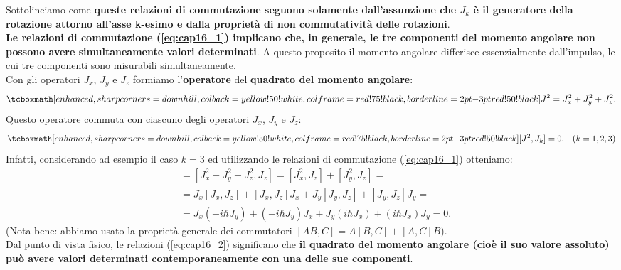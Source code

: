 Sottolineiamo come \textbf{queste relazioni di commutazione seguono solamente dall'assunzione che $J_k$ è il generatore della rotazione attorno all'asse k-esimo e dalla proprietà di non commutatività delle rotazioni}.\\

\textbf{Le relazioni di commutazione (\ref{eq:cap16_1}) implicano che, in generale, le tre componenti del momento angolare non possono avere simultaneamente valori determinati}. A questo proposito il momento angolare differisce essenzialmente dall'impulso, le cui tre componenti sono misurabili simultaneamente.\\
		
Con gli operatori $J_x$, $J_y$ e $J_z$ formiamo l'\textbf{operatore} del \textbf{quadrato del momento angolare}:
	\begin{equation}
		\tcboxmath[enhanced, sharp corners=downhill, colback=yellow!50!white, colframe=red!75!black, borderline={2pt}{-3pt}{red!50!black}]{
			J^2 = J_x ^2 + J_y ^2 + J_z ^2.
			}
	\end{equation}
Questo operatore commuta con ciascuno degli operatori $J_x$, $J_y$ e $J_z$:
	\begin{equation}
		\tcboxmath[enhanced, sharp corners=downhill, colback=yellow!50!white, colframe=red!75!black, borderline={2pt}{-3pt}{red!50!black}]{
			[J^2, J_k]=0.
			} \quad (k=1,2,3)
	\label{eq:cap16_2}
	\end{equation}
Infatti, considerando ad esempio il caso $k=3$ ed utilizzando le relazioni di commutazione (\ref{eq:cap16_1}) otteniamo:
	\begin{align}
		[J^2, J_z] &= [J_x ^2+J_y^2+J_z ^2, J_z] = [J_x ^2, J_z]+[J_y ^2, J_z]= \nonumber \\
	& = J_x[J_x, J_z]+[J_x, J_z]J_x+J_y[J_y, J_z]+[J_y, J_z]J_y =  \nonumber \\
	& =  J_x (-i\hbar J_y)+ (-i\hbar J_y)J_x+ J_y (i\hbar J_x)+(i\hbar J_x)J_y =  0.  
	\end{align}
(Nota bene: abbiamo usato la proprietà generale dei commutatori $[AB,C]=A[B,C]+[A,C]B$).\\

Dal punto di vista fisico, le relazioni (\ref{eq:cap16_2}) significano che \textbf{il quadrato del momento angolare (cioè il suo valore assoluto) può avere valori determinati contemporaneamente con una delle sue componenti}.

